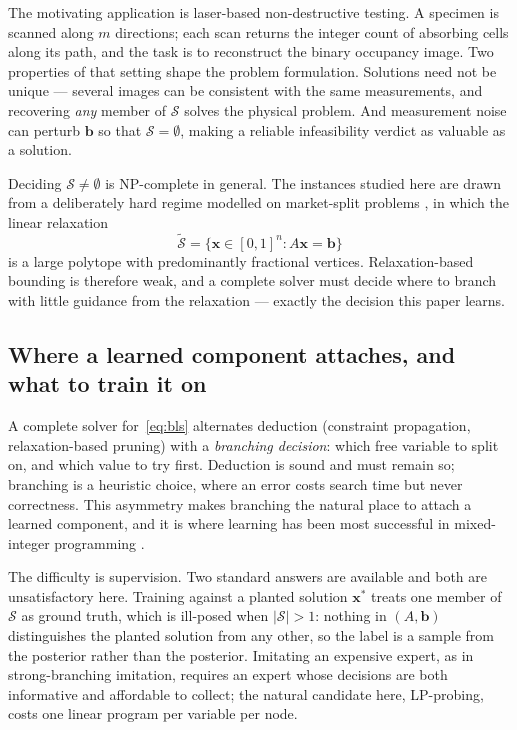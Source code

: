\documentclass[preprint,12pt]{elsarticle}
\newcommand{\SOL}{\mathcal{S}}
\begin{document}
The motivating application is laser-based non-destructive testing. A specimen is scanned along $m$ directions; each scan returns the integer count of absorbing cells along its path, and the task is to reconstruct the binary occupancy image. Two properties of that setting shape the problem formulation. Solutions need not be unique --- several images can be consistent with the same measurements, and recovering \emph{any} member of $\SOL$ solves the physical problem. And measurement noise can perturb $\mathbf{b}$ so that $\SOL=\emptyset$, making a reliable infeasibility verdict as valuable as a solution.

Deciding $\SOL\ne\emptyset$ is NP-complete in general. The instances studied here are drawn from a deliberately hard regime modelled on market-split problems \citep{cornuejols1999market, aardal2000market}, in which the linear relaxation
\begin{equation}
\tilde{\SOL} = \{\mathbf{x}\in[0,1]^n : A\mathbf{x}=\mathbf{b}\}
\end{equation}
is a large polytope with predominantly fractional vertices. Relaxation-based bounding is therefore weak, and a complete solver must decide where to branch with little guidance from the relaxation --- exactly the decision this paper learns.

\subsection{Where a learned component attaches, and what to train it on}

A complete solver for~\eqref{eq:bls} alternates deduction (constraint propagation, relaxation-based pruning) with a \emph{branching decision}: which free variable to split on, and which value to try first. Deduction is sound and must remain so; branching is a heuristic choice, where an error costs search time but never correctness. This asymmetry makes branching the natural place to attach a learned component, and it is where learning has been most successful in mixed-integer programming \citep{khalil2016learning, gasse2019exact}.

The difficulty is supervision. Two standard answers are available and both are unsatisfactory here. Training against a planted solution $\mathbf{x}^\ast$ treats one member of $\SOL$ as ground truth, which is ill-posed when $|\SOL|>1$: nothing in $(A,\mathbf{b})$ distinguishes the planted solution from any other, so the label is a sample from the posterior rather than the posterior. Imitating an expensive expert, as in strong-branching imitation, requires an expert whose decisions are both informative and affordable to collect; the natural candidate here, LP-probing, costs one linear program per variable per node.
\end{document}
